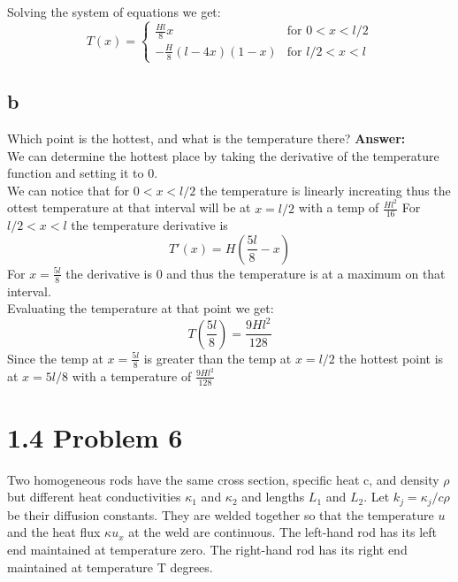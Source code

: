 \documentclass{article}
\begin{document}
Solving the system of equations we get:
$$T(x) = \begin{cases}
\frac{Hl}{8}x & \text{for } 0 < x < l/2 \\
-\frac{H}{8}(l-4x)(1-x) & \text{for } l/2 < x < l
\end{cases}$$

\subsection*{b} 
Which point is the hottest, and what is the temperature there?
\textbf{Answer:}\\
We can determine the hottest place by taking the derivative of the temperature function and setting it to 0.\\
We can notice that for $0 < x < l/2$ the temperature is linearly increating thus the ottest temperature at that interval will be at $x = l/2$ with a temp of $\frac{Hl^2}{16}$
For $l/2 < x < l$ the temperature derivative is 
$$ T'(x) = H(\frac{5l}{8} - x)$$
For $x = \frac{5l}{8}$ the derivative is 0 and thus the temperature is at a maximum on that interval.\\
Evaluating the temperature at that point we get:
$$ T(\frac{5l}{8}) = \frac{9Hl^2}{128}$$  Since the temp at $x = \frac{5l}{8}$ is greater than the temp at $x = l/2$ the hottest point is at $x = 5l/8$ with a temperature of $\frac{9Hl^2}{128}$




\section*{1.4 Problem 6 }
Two homogeneous rods have the same cross section, specific heat c, and
density $\rho$ but different heat conductivities $\kappa_1$ and $\kappa_2$ and lengths $L_1$ and $L_2$. Let $k_j = \kappa_j/c\rho$ be their diffusion constants. They are welded together
so that the temperature $u$ and the heat flux $\kappa u_x$ at the weld are continuous.
The left-hand rod has its left end maintained at temperature zero. The
right-hand rod has its right end maintained at temperature T degrees.\\
\end{document}
